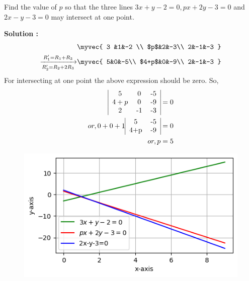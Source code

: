 Find the value of $p$ so that the three lines $3x+y-2=0,px+2y-3=0$ and $2x-y-3=0$ may intersect at one point.


\textbf{Solution :}
\begin{align}  
&\myvec{
    3 &1&-2 \\
     $p$&2&-3\\
     2&-1&-3
}\\
\xrightarrow[R_2'=R_2+2R_3]{R_1'=R_1+R_3}&\myvec{
    5&0&-5\\
     $4+p$&0&-9\\
     2&-1&-3
}
\end{align}
For intersecting at one point the above expression should be zero.
So,
\begin{align}
 \begin{tabular}{|c c c|}
    5&0&-5\\
     $4+p$&0&-9\\
     2&-1&-3
\end{tabular}&=0\\
or,0+0+1\begin{tabular}{|c c|}
    5&-5  \\
    4+p &-9
\end{tabular}&=0\\
or,p&=5
\end{align}


\begin{figure}[H]
    \centering
	\includegraphics[width=\columnwidth]{chapters/11/10/4/9/fig/11.10.4.9.png}
    \caption{}
    \label{11.10.4.9}
\end{figure}
